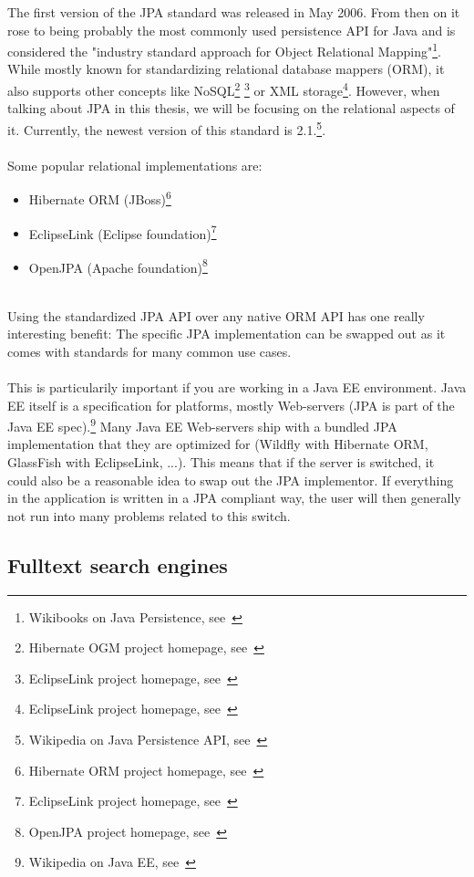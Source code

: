 The first version of the JPA standard was released in May 2006. From then on it rose to being probably the most commonly used persistence API for Java and is considered the "industry standard approach for Object Relational Mapping"\footnote{Wikibooks on Java Persistence, see~\cite{wikibooks_on_jpa}}. While mostly known for standardizing relational database mappers (ORM), it also supports other concepts like NoSQL\footnote{Hibernate OGM project homepage, see~\cite{hibernate_ogm}} \footnote{EclipseLink project homepage, see~\cite{eclipselink}} or XML storage\footnote{EclipseLink project homepage, see~\cite{eclipselink}}. However, when talking about JPA in this thesis, we will be focusing on the relational aspects of it. Currently, the newest version of this standard is 2.1.\footnote{Wikipedia on Java Persistence API, see~\cite{wiki_jpa}}.
\\\\
Some popular relational implementations are:
\begin{itemize}
	\item Hibernate ORM (JBoss)\footnote{Hibernate ORM project homepage, see~\cite{hibernate_orm}}
	\item EclipseLink (Eclipse foundation)\footnote{EclipseLink project homepage, see~\cite{eclipselink}}
	\item OpenJPA (Apache foundation)\footnote{OpenJPA project homepage, see~\cite{openjpa}}
\end{itemize}
~\\
Using the standardized JPA API over any native ORM API has one really interesting benefit:
The specific JPA implementation can be swapped out as it comes with standards for many common use cases.
\\\\
This is particularily important if you are working in a Java EE environment. Java EE itself is a specification for platforms, mostly Web-servers (JPA is part of the Java EE spec).\footnote{Wikipedia on Java EE, see~\cite{wiki_java_ee}} Many Java EE Web-servers ship with a bundled JPA implementation that they are optimized for (Wildfly with Hibernate ORM, GlassFish with EclipseLink, ...). This means that if the server is switched, it could also be a reasonable idea to swap out the JPA implementor. If everything in the application is written in a JPA compliant way, the user will then generally not run into many problems related to this switch.

\pagebreak

\subsection{Fulltext search engines}

